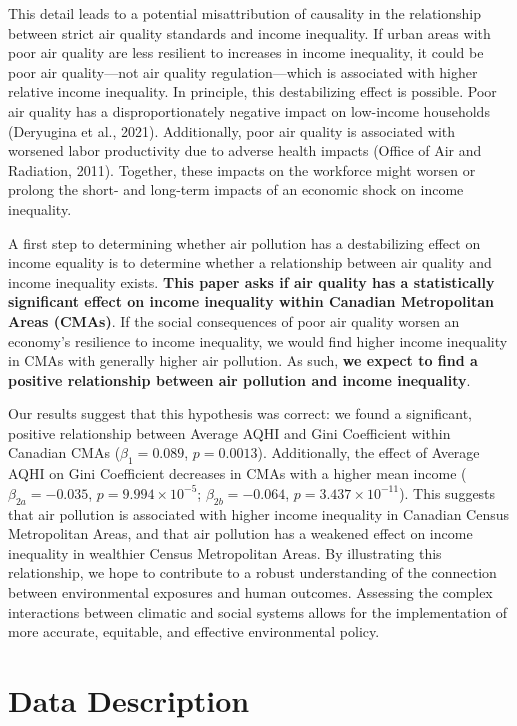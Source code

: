 \documentclass[AEJ]{AEA}
\begin{document}
This detail leads to a potential misattribution of causality in the
relationship between strict air quality standards and income inequality. If 
urban areas with poor air quality are less resilient to increases in income
inequality, it could be poor air quality—not air quality regulation—which 
is associated with higher relative income inequality. In principle, this 
destabilizing effect is possible. Poor air quality has a disproportionately
negative impact on low-income households (Deryugina et al., 2021). Additionally, 
poor air quality
is associated with worsened labor productivity due to adverse health impacts
(Office of Air and Radiation, 2011). Together, these impacts on the workforce 
might worsen or prolong the short- and
long-term impacts of an economic shock on income inequality.

A first step to determining whether air pollution has a destabilizing effect on
income equality is to determine whether a relationship between air quality and
income inequality exists. \textbf{This paper asks if air quality has a
statistically significant effect on income inequality within Canadian
Metropolitan Areas (CMAs)}. If the social consequences of poor 
air quality worsen an economy's resilience to income inequality, we would find
higher income inequality in CMAs with generally higher air pollution.
As such, \textbf{we expect to find a positive relationship between
air pollution and income inequality}. 

Our results suggest that this hypothesis was correct: we found
a significant, positive relationship between Average 
AQHI and Gini Coefficient within Canadian CMAs ($\beta_1 = 0.089$, $p = 0.0013$). 
Additionally, the effect of Average AQHI on Gini Coefficient decreases in CMAs 
with a higher mean income ($\beta_{2a} = -0.035$,
$p = 9.994 \times 10^{-5}$; $\beta_{2b} = -0.064$, $p = 3.437\times10^{-11}$). 
This suggests that air pollution is associated with higher income inequality in Canadian
Census Metropolitan Areas, and that air pollution has a weakened effect on income inequality 
in wealthier Census Metropolitan Areas.
By illustrating this relationship, we hope to 
contribute to a robust understanding of the connection between environmental
exposures and human outcomes. Assessing the complex interactions between
climatic and social systems allows for the implementation of more accurate,
equitable, and effective environmental policy. 

\section{Data Description}
\end{document}
